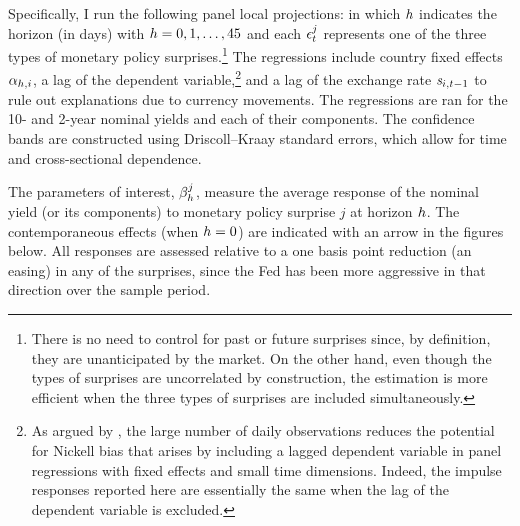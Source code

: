 {Specifically, I run the following panel local projections:
\noindent in which 
\(h\) indicates the horizon (in days) with \(h = 0, 1, \ldots, 45\) and each \(\epsilon^{j}_{t}\) represents one of the three types of monetary policy surprises.\footnote{ There is no need to control for past or future surprises since, by definition, they are unanticipated by the market. On the other hand, even though the types of surprises are uncorrelated by construction, the estimation is more efficient when the three types of surprises are included simultaneously.} %
The regressions include country fixed effects \(\alpha_{h,i}\), a lag of the dependent variable,\footnote{ As argued by \cite{HofmannShimShin:2019}, the large number of daily observations reduces the potential for Nickell bias that arises by including a lagged dependent variable in panel regressions with fixed effects and small time dimensions. Indeed, the impulse responses reported here are essentially the same when the lag of the dependent variable is excluded.} %
and a lag of the exchange rate \(\mathit{s}_{i,{t-1}}\) to rule out explanations due to currency movements. %
The regressions are ran for the 10- and 2-year nominal yields and each of their components.
The confidence bands are constructed using Driscoll--Kraay standard errors, which allow for time and cross-sectional dependence.

The parameters of interest, \(\beta^{j}_{h}\), measure the average response of the nominal yield (or its components) to monetary policy surprise \(j\) at horizon \(h\). 
The contemporaneous effects (when \(h = 0\)) are indicated with an arrow in the figures below.
All responses are assessed relative to a one basis point reduction (an easing) in any of the surprises, since the Fed has been more aggressive in that direction over the sample period.

}
